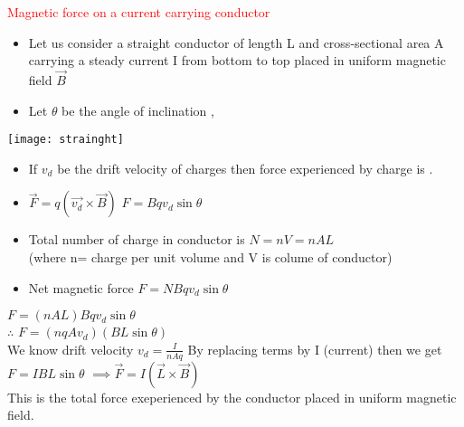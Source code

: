 \documentclass{beamer}
\begin{document}
\begin{frame}
\textcolor{red}{Magnetic force on a current carrying conductor}\\

\begin{minipage}{0.7\textwidth}
\begin{itemize}
\item Let us consider a straight conductor of length L
and cross-sectional area A carrying a steady current I from
bottom to top placed in uniform magnetic field $\vec{B}$
\item Let $\theta$ be the angle of inclination ,
\end{itemize}
\end{minipage}%
\begin{minipage}{0.3\textwidth}
    \texttt{[image: strainght]} %
\end{minipage}



\begin{itemize}

\item If $v_d$ be the drift velocity of charges then force experienced by charge is .
\item $\vec{F}=q(\vec{v_d}\times\vec{B})$
\textbf{$F=Bqv_d\sin\theta$ }
\item Total number of charge in conductor is $N=nV=nAL$ \\
(where n= charge per unit volume and V is colume of conductor)
\item Net magnetic force $F=NBqv_d\sin\theta$
\end{itemize}
\hspace{1cm} $F=(nAL)Bqv_d\sin\theta$\\
\hspace{2cm} $\therefore$ \textbf{$F=(nqAv_d)(BL\sin\theta)$}\\
We know drift velocity $v_d=\frac{I}{nAq}$ By replacing terms by I (current) then we get \\
\hspace{3cm} \textbf{$F=IBL\sin\theta$} $\implies \vec{F}=I(\vec{L}\times\vec{B})$ \\
This is the total force exeperienced by the conductor placed in uniform magnetic field.
\end{frame}
\end{document}
